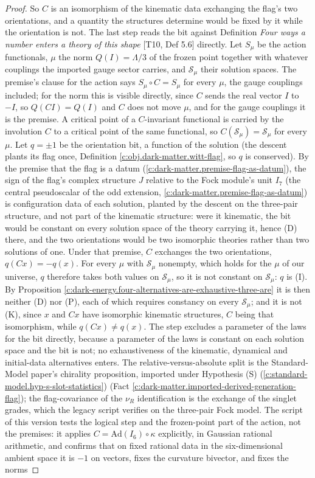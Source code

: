 \documentclass[11pt]{article}
\theoremstyle{definition}
\theoremstyle{plain}
\begin{document}
\begin{proof}
So $C$ is an isomorphism of the kinematic data exchanging the flag's two orientations, and a quantity the structures determine would be fixed by it while the orientation is not. The last step reads the bit against Definition \emph{Four ways a number enters a theory of this shape} [T10, Def 5.6] directly. Let $S_{\mu}$ be the action functionals, $\mu$ the norm $Q(I) = \Lambda/3$ of the frozen point together with whatever couplings the imported gauge sector carries, and $\mathcal{S}_{\mu}$ their solution spaces. The premise's clause for the action says $S_{\mu} \circ C = S_{\mu}$ for every $\mu$, the gauge couplings included; for the norm this is visible directly, since $C$ sends the real vector $I$ to $-I$, so $Q(CI) = Q(I)$ and $C$ does not move $\mu$, and for the gauge couplings it is the premise. A critical point of a $C$-invariant functional is carried by the involution $C$ to a critical point of the same functional, so $C(\mathcal{S}_{\mu}) = \mathcal{S}_{\mu}$ for every $\mu$. Let $q = \pm 1$ be the orientation bit, a function of the solution (the descent plants its flag once, Definition \ref{c:obj.dark-matter.witt-flag}, so $q$ is conserved). By the premise that the flag is a datum (\ref{c:dark-matter.premise-flag-as-datum}), the sign of the flag's complex structure $J$ relative to the Fock module's unit $I_7$ (the central pseudoscalar of the odd extension, \ref{c:dark-matter.premise-flag-as-datum}) is configuration data of each solution, planted by the descent on the three-pair structure, and not part of the kinematic structure: were it kinematic, the bit would be constant on every solution space of the theory carrying it, hence (D) there, and the two orientations would be two isomorphic theories rather than two solutions of one. Under that premise, $C$ exchanges the two orientations, $q(Cx) = -q(x)$. For every $\mu$ with $\mathcal{S}_{\mu}$ nonempty, which holds for the $\mu$ of our universe, $q$ therefore takes both values on $\mathcal{S}_{\mu}$, so it is not constant on $\mathcal{S}_{\mu}$: $q$ is (I). By Proposition \ref{c:dark-energy.four-alternatives-are-exhaustive-three-are} it is then neither (D) nor (P), each of which requires constancy on every $\mathcal{S}_{\mu}$; and it is not (K), since $x$ and $Cx$ have isomorphic kinematic structures, $C$ being that isomorphism, while $q(Cx) \neq q(x)$. The step excludes a parameter of the laws for the bit directly, because a parameter of the laws is constant on each solution space and the bit is not; no exhaustiveness of the kinematic, dynamical and initial-data alternatives enters. The relative-versus-absolute split is the Standard-Model paper's chirality proposition, imported under Hypothesis (S) (\ref{c:standard-model.hyp-s-slot-statistics}) (Fact \ref{c:dark-matter.imported-derived-generation-flag}); the flag-covariance of the $\nu_{R}$ identification is the exchange of the singlet grades, which the legacy script verifies on the three-pair Fock model. The script of this version tests the logical step and the frozen-point part of the action, not the premises: it applies $C = \mathrm{Ad}(I_{6}) \circ \kappa$ explicitly, in Gaussian rational arithmetic, and confirms that on fixed rational data in the six-dimensional ambient space it is $-1$ on vectors, fixes the curvature bivector, and fixes the norms 
\end{proof}
\end{document}
